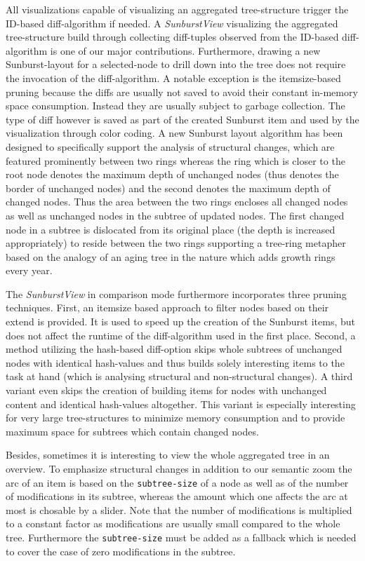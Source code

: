 All visualizations capable of visualizing an aggregated tree-structure trigger the ID-based diff-algorithm if needed. A \emph{SunburstView} visualizing the aggregated tree-structure build through collecting diff-tuples observed from the ID-based diff-algorithm is one of our major contributions. Furthermore, drawing a new Sunburst-layout for a selected-node to drill down into the tree does not require the invocation of the diff-algorithm. A notable exception is the itemsize-based pruning because the diffs are usually not saved to avoid their constant in-memory space consumption. Instead they are usually subject to garbage collection. The type of diff however is saved as part of the created Sunburst item and used by the visualization through color coding. A new Sunburst layout algorithm has been designed to specifically support the analysis of structural changes, which are featured prominently between two rings whereas the ring which is closer to the root node denotes the maximum depth of unchanged nodes (thus denotes the border of unchanged nodes) and the second denotes the maximum depth of changed nodes. Thus the area between the two rings encloses all changed nodes as well as unchanged nodes in the subtree of updated nodes. The first changed node in a subtree is dislocated from its original place (the depth is increased appropriately) to reside between the two rings supporting a tree-ring metapher based on the analogy of an aging tree in the nature which adds growth rings every year.

The \emph{SunburstView} in comparison mode furthermore incorporates three pruning techniques. First, an itemsize based approach to filter nodes based on their extend is provided. It is used to speed up the creation of the Sunburst items, but does not affect the runtime of the diff-algorithm used in the first place. Second, a method utilizing the hash-based diff-option skips whole subtrees of unchanged nodes with identical hash-values and thus builds solely interesting items to the task at hand (which is analysing structural and non-structural changes). A third variant even skips the creation of building items for nodes with unchanged content and identical hash-values altogether. This variant is especially interesting for very large tree-structures to minimize memory consumption and to provide maximum space for subtrees which contain changed nodes.

Besides, sometimes it is interesting to view the whole aggregated tree in an overview. To emphasize structural changes in addition to our semantic zoom the arc of an item is based on the \texttt{subtree-size} of a node as well as of the number of modifications in its subtree, whereas the amount which one affects the arc at most is chosable by a slider. Note that the number of modifications is multiplied to a constant factor as modifications are usually small compared to the whole tree. Furthermore the \texttt{subtree-size} must be added as a fallback which is needed to cover the case of zero modifications in the subtree.

